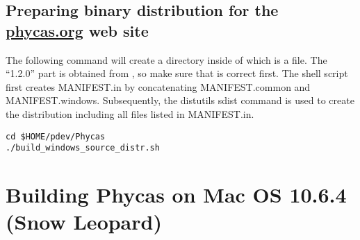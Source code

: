 \begin{enumerate}
\subsection*{Preparing binary distribution for the \url{phycas.org} web site}
The following command will create a  directory inside of which is a  file. The ``1.2.0'' part is obtained from , so make sure that is correct first. The shell script first creates MANIFEST.in by concatenating MANIFEST.common and MANIFEST.windows. Subsequently, the distutils sdist command is used to create the distribution including all files listed in MANIFEST.in.
\begin{verbatim}
cd $HOME/pdev/Phycas
./build_windows_source_distr.sh
\end{verbatim}

\section{Building Phycas on Mac OS 10.6.4 (Snow Leopard)}

\end{enumerate}

